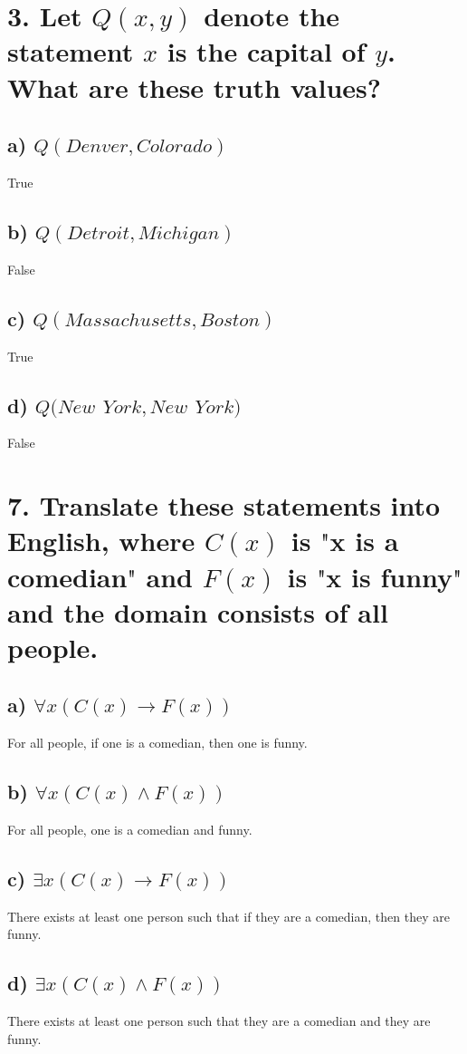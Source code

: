 \documentclass[11pt, oneside]{article} %
\numberwithin{equation}{section} %
\numberwithin{figure}{section} %
\numberwithin{table}{section} %
\begin{document}
\begin{table}[!htp]
\section{}
\section{3. Let $Q(x, y)$ denote the statement $x$ is the capital of $y$. What are these truth values?}
\subsection{a) $Q(Denver, Colorado)$}
True
\subsection{b) $Q(Detroit, Michigan)$}
False
\subsection{c) $Q(Massachusetts, Boston)$}
True
\subsection{d) $Q(New$ $York, New$ $York)$}
False

\end{table}

\begin{table}[!htp]
\section{7. Translate these statements into English, where $C(x)$ is $\texttt{"}$x is a comedian$\texttt{"}$ and $F(x)$ is $\texttt{"}$x is funny$\texttt{"}$ and the domain consists of all people.}
\subsection{a) $\forall$$x(C(x) \rightarrow F(x))$}
For all people, if one is a comedian, then one is funny.
\subsection{b) $\forall$$x(C(x) \wedge F(x))$}
For all people, one is a comedian and funny.
\subsection{c) $\exists$$x(C(x) \rightarrow F(x))$}
There exists at least one person such that if they are a comedian, then they are funny.
\subsection{d) $\exists$$x(C(x) \wedge F(x))$}
There exists at least one person such that they are a comedian and they are funny.

\end{table}
\end{document}
